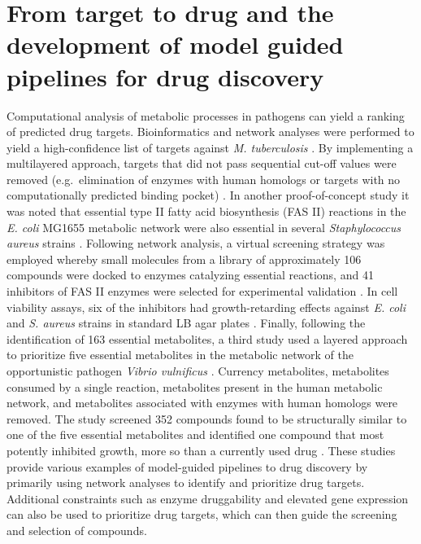 \section{From target to drug and the development of 
         model guided pipelines for drug discovery}
Computational analysis of metabolic processes in pathogens can 
yield a ranking of predicted drug targets. Bioinformatics and 
network analyses were performed to yield a high-confidence list 
of targets against \textit{M. tuberculosis} \cite{Raman:2008km}. By implementing a 
multilayered approach, targets that did not pass sequential 
cut-off values were removed (e.g.\ elimination of enzymes with 
human homologs or targets with no computationally predicted 
binding pocket) \cite{Raman:2008km}. In another proof-of-concept study it 
was noted that essential type II fatty acid biosynthesis (FAS II) 
reactions in the \textit{E. coli} MG1655 metabolic network were also 
essential in several \textit{Staphylococcus aureus} strains \cite{Shen:2010cy}. Following 
network analysis, a virtual screening strategy was employed 
whereby small molecules from a library of approximately 106 
compounds were docked to enzymes catalyzing essential reactions, 
and 41 inhibitors of FAS II enzymes were selected for experimental 
validation \cite{Shen:2010cy}. In cell viability assays, six of the inhibitors 
had growth-retarding effects against \textit{E. coli} and \textit{S. aureus} 
strains in standard LB agar plates \cite{Shen:2010cy}. Finally, following 
the identification of 163 essential metabolites, a third study 
used a layered approach to prioritize five essential metabolites 
in the metabolic network of the opportunistic pathogen 
\textit{Vibrio vulnificus} \cite{Kim:2011jm}. Currency metabolites, metabolites consumed by 
a single reaction, metabolites present in the human metabolic 
network, and metabolites associated with enzymes with human 
homologs were removed. The study screened 352 compounds found 
to be structurally similar to one of the five essential metabolites 
and identified one compound that most potently inhibited growth, 
more so than a currently used drug \cite{Kim:2011jm}. These studies provide 
various examples of model-guided pipelines to drug discovery by 
primarily using network analyses to identify and prioritize drug 
targets. Additional constraints such as enzyme druggability and 
elevated gene expression can also be used to prioritize drug 
targets, which can then guide the screening and selection of compounds.

